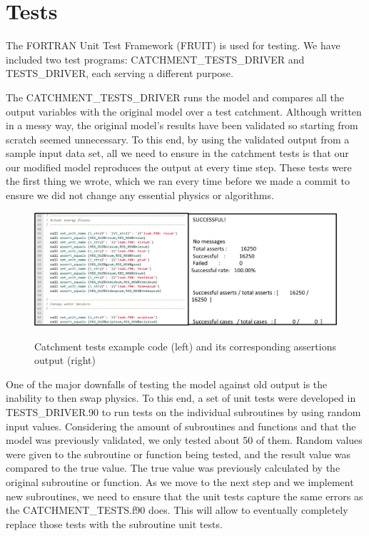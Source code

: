 \documentclass[pdftex,12pt,a4paper]{article}
\begin{document}
\section{Tests}

The FORTRAN Unit Test Framework (FRUIT) is used for testing. We have included two test programs: CATCHMENT\_TESTS\_DRIVER and TESTS\_DRIVER, each serving a different purpose.

The CATCHMENT\_TESTS\_DRIVER runs the model and compares all the output variables with the original model over a test catchment. Although written in a messy way, the original model's results have been validated so starting from scratch seemed unnecessary. To this end, by using the validated output from a sample input data set, all we need to ensure in the catchment tests is that our our modified model reproduces the output at every time step. These tests were the first thing we wrote, which we ran every time before we made a commit to ensure we did not change any essential physics or algorithms. 

\begin{figure}[h]
	\centering
	\includegraphics[width=5.5in]{Figures/Tests1.png}
	\label{Tests1}
	\caption{Catchment tests example code (left) and its corresponding assertions output (right)}
\end{figure}

One of the major downfalls of testing the model against old output is the inability to then swap physics. To this end, a set of unit tests were developed in TESTS\_DRIVER.90 to run tests on the individual subroutines by using random input values.  Considering the amount of subroutines and functions and that the model was previously validated, we only tested about 50 of them. Random values were given to the subroutine or function being tested, and the result value was compared to the true value. The true value was previously calculated by the original subroutine or function. As we move to the next step and we implement new subroutines, we need to ensure that the unit tests capture the same errors as the CATCHMENT\_TESTS.f90 does. This will allow to eventually completely replace those tests with the subroutine unit tests.
\end{document}
